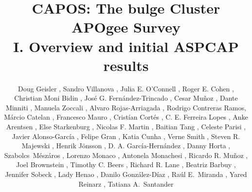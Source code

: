 \documentclass[onecolumn]{aa}
\begin{document}
 


   \title{CAPOS: The bulge Cluster APOgee Survey \\   I.  Overview and initial ASPCAP results}

   \author{Doug Geisler , Sandro Villanova , Julia E. O\rq{}Connell , Roger E. Cohen ,
    Christian Moni Bidin ,
   Jos\'e G. Fern\'andez-Trincado , Cesar Mu\~noz ,
   Dante Minniti ,
   Manuela Zoccali , Alvaro Rojas-Arriagada , Rodrigo Contreras Ramos,  
   M\'arcio Catelan , Francesco Mauro ,
   Crist\'ian Cort\'es , C. E. Ferreira Lopes ,
   Anke Arentsen , Else Starkenburg , Nicolas F. Martin , Baitian Tang ,
   Celeste Parisi , Javier Alonso-Garc\'{i}a , 
   Felipe Gran , Katia Cunha , Verne Smith , 
   Steven R. Majewski , 
   Henrik J\"onsson ,
   D. A. Garc\'ia-Hern\'andez ,
   Danny Horta ,
   Szabolcs~M{\'e}sz{\'a}ros ,
   Lorenzo Monaco , Antonela Monachesi ,
   Ricardo R. Mu\~noz ,
  Joel Brownstein , 
  Timothy C. Beers ,
  Richard R. Lane ,
  Beatriz Barbuy ,
  Jennifer Sobeck ,
  Lady Henao ,
  Danilo Gonz\'alez-D\'iaz ,
  Ra\'ul E.~Miranda ,
  Yared Reinarz ,
  Tatiana A.~Santander 
}
   
\end{document}
